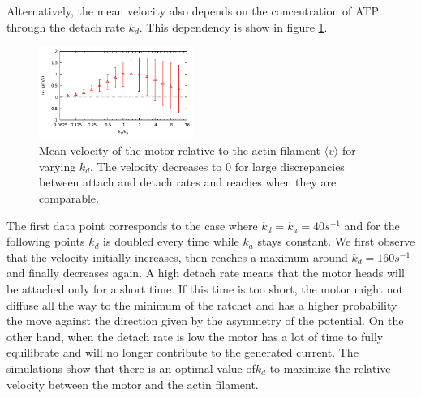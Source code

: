 \documentclass[aps,pre,twocolumn,showpacs,showkeys,a4paper]{revtex4}
\begin{document}
Alternatively, the mean velocity also depends on the concentration of ATP through the detach rate $k_{d}$. 
This dependency is show in figure \ref{Fig: v_k}.
\begin{figure}[t]
\centering
\includegraphics[width=0.45\textwidth,height=!]{v_k}
\caption{Mean velocity of the motor relative to the actin filament $\langle v \rangle$ for varying $k_{d}$.
The velocity decreases to $0$ for large discrepancies between attach and detach rates and reaches when they are comparable.
}
\label{Fig: v_k} 
\end{figure}
The first data point corresponds to the case where $k_{d} = k_{a} = 40 s^{-1}$ and for the following points $k_{d}$ is doubled every time while $k_{a}$ stays constant. 
We first observe that the velocity initially increases, then reaches a maximum around $k_{d} = 160 s^{-1}$ and finally decreases again. 
A high detach rate means that the motor heads will be attached only for a short time. 
If this time is too short, the motor might not diffuse all the way to the minimum of the ratchet and has a higher probability the move against the direction given by the asymmetry of the potential. 
On the other hand, when the detach rate is low the motor has a lot of time to fully equilibrate and will no longer contribute to the generated current. 
The simulations show that there is an optimal value of$k_{d}$ to maximize the relative velocity between the motor and the actin filament. 
\end{document}
